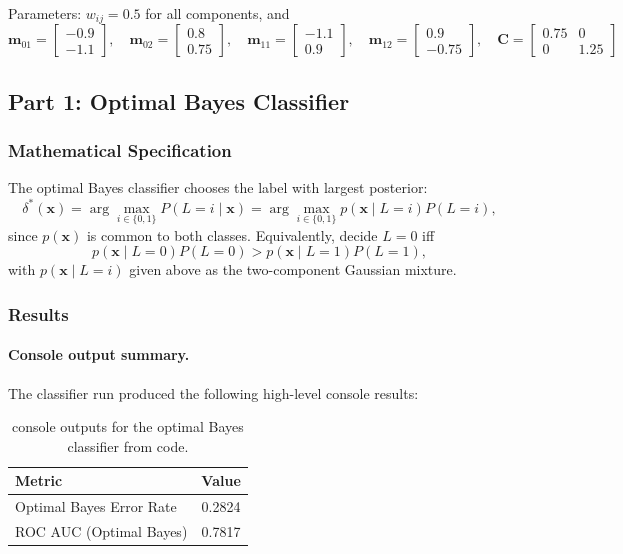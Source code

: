 \documentclass[12pt]{article}
\begin{document}
Parameters: $w_{ij} = 0.5$ for all components, and
\[
\mathbf{m}_{01} = \begin{bmatrix} -0.9 \\ -1.1 \end{bmatrix}, \quad
\mathbf{m}_{02} = \begin{bmatrix} 0.8 \\ 0.75 \end{bmatrix}, \quad
\mathbf{m}_{11} = \begin{bmatrix} -1.1 \\ 0.9 \end{bmatrix}, \quad
\mathbf{m}_{12} = \begin{bmatrix} 0.9 \\ -0.75 \end{bmatrix}, \quad
\mathbf{C} = \begin{bmatrix} 0.75 & 0 \\ 0 & 1.25 \end{bmatrix}
\]

\subsection{Part 1: Optimal Bayes Classifier}

\subsubsection{Mathematical Specification}
The optimal Bayes classifier chooses the label with largest posterior:
\[
\delta^*(\mathbf{x})=\arg\max_{i\in\{0,1\}} P(L=i\mid\mathbf{x})
=\arg\max_{i\in\{0,1\}} p(\mathbf{x}\mid L=i)P(L=i),
\]
since $p(\mathbf{x})$ is common to both classes. Equivalently, decide $L=0$ iff
\[
p(\mathbf{x}\mid L=0)P(L=0) > p(\mathbf{x}\mid L=1)P(L=1),
\]
with $p(\mathbf{x}\mid L=i)$ given above as the two-component Gaussian mixture.

\subsubsection{Results}
\paragraph{Console output summary.}
The classifier run produced the following high-level console results:

\begin{table}[H]
\centering
\begin{tabular}{lc}
\toprule
Metric & Value \\
\midrule
Optimal Bayes Error Rate & 0.2824 \\
ROC AUC (Optimal Bayes)   & 0.7817 \\
\bottomrule
\end{tabular}
\caption{ console outputs for the optimal Bayes classifier from code.}
\label{tab:console_part1}
\end{table}
\end{document}
